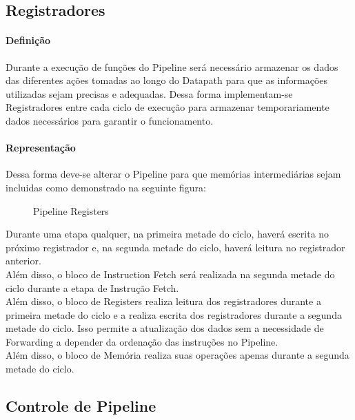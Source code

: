 \documentclass{article}
\begin{document}
\subsection{Registradores}
\paragraph{Definição}Durante a execução de funções do Pipeline será necessário armazenar os dados das diferentes ações tomadas ao longo do Datapath para que as informações utilizadas sejam precisas e adequadas. Dessa forma implementam-se Registradores entre cada ciclo de execução para armazenar temporariamente dados necessários para garantir o funcionamento.

\paragraph{Representação}Dessa forma deve-se alterar o Pipeline para que memórias intermediárias sejam incluidas como demonstrado na seguinte figura:
\begin{figure}[H]
    \centering
    \caption{Pipeline Registers}
    \label{pipelineRegisters}
\end{figure}
\noindent Durante uma etapa qualquer, na primeira metade do ciclo, haverá escrita no próximo registrador e, na segunda metade do ciclo, haverá leitura no registrador anterior.\\

\noindent Além disso, o bloco de Instruction Fetch será realizada na segunda metade do ciclo durante a etapa de Instrução Fetch.\\

\noindent Além disso, o bloco de Registers realiza leitura dos registradores durante a primeira metade do ciclo e a realiza escrita dos registradores durante a segunda metade do ciclo. Isso permite a atualização dos dados sem a necessidade de Forwarding a depender da ordenação das instruções no Pipeline.\\

\noindent Além disso, o bloco de Memória realiza suas operações apenas durante a segunda metade do ciclo.



\subsection{Controle de Pipeline}
\end{document}
